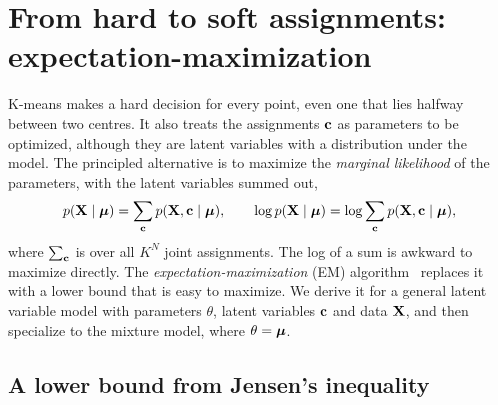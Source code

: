 \section{From hard to soft assignments: expectation-maximization}
\label{sec:em}

K-means makes a hard decision for every point, even one that lies halfway between two centres. It also treats the assignments $\mathbf{c}$ as parameters to be optimized, although they are latent variables with a distribution under the model. The principled alternative is to maximize the \emph{marginal likelihood} of the parameters, with the latent variables summed out,
\begin{equation}
  p(\mathbf{X}\mid\boldsymbol{\mu}) = \sum_{\mathbf{c}}p(\mathbf{X},\mathbf{c}\mid\boldsymbol{\mu}), \qquad
  \log p(\mathbf{X}\mid\boldsymbol{\mu}) = \log\sum_{\mathbf{c}}p(\mathbf{X},\mathbf{c}\mid\boldsymbol{\mu}),
  \label{eq:marginal}
\end{equation}
where $\sum_{\mathbf{c}}$ is over all $K^N$ joint assignments. The log of a sum is awkward to maximize directly. The \emph{expectation-maximization} (EM) algorithm~\citep{dempster1977} replaces it with a lower bound that is easy to maximize. We derive it for a general latent variable model with parameters $\theta$, latent variables $\mathbf{c}$ and data $\mathbf{X}$, and then specialize to the mixture model, where $\theta=\boldsymbol{\mu}$.

\subsection{A lower bound from Jensen's inequality}

